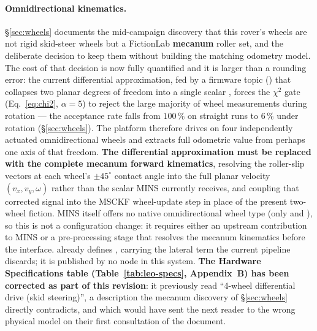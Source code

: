 \paragraph{Omnidirectional kinematics.}
\label{ap:roadmap-kinematics}
\S\ref{sec:wheels} documents the mid-campaign discovery that this rover's
wheels are not rigid skid-steer wheels but a FictionLab \textbf{mecanum}
roller set, and the deliberate decision to keep them without building the
matching odometry model. The cost of that decision is now fully quantified
and it is larger than a rounding error: the current 
differential approximation, fed by a firmware topic
() that collapses two planar degrees of freedom
into a single scalar , forces the $\chi^2$ gate
(Eq.~\ref{eq:chi2}, $\alpha=5$) to reject the large majority of wheel
measurements during rotation --- the acceptance rate falls from $100\,\%$ on
straight runs to $6\,\%$ under rotation (\S\ref{sec:wheels}). The platform
therefore drives on four independently actuated omnidirectional wheels and
extracts full odometric value from perhaps one axis of that freedom.
\textbf{The differential approximation must be replaced with the complete
mecanum forward kinematics}, resolving the roller-slip vectors at each
wheel's $\pm45^\circ$ contact angle into the full planar velocity
$(v_x, v_y, \omega)$ rather than the scalar MINS currently receives, and
coupling that corrected signal into the MSCKF wheel-update step in place of
the present two-wheel fiction. MINS itself offers no native omnidirectional
wheel type (only  and ), so
this is not a configuration change: it requires either an upstream
contribution to MINS or a pre-processing stage that resolves the mecanum
kinematics before the  interface.  already
defines , carrying the lateral term the current
pipeline discards; it is published by no node in this system.
\textbf{The Hardware Specifications table (Table~\ref{tab:leo-specs},
Appendix~B) has been corrected as part of this revision}: it previously
read ``4-wheel differential drive (skid steering)'', a description the
mecanum discovery of \S\ref{sec:wheels} directly contradicts, and which
would have sent the next reader to the wrong physical model on their first
consultation of the document.

